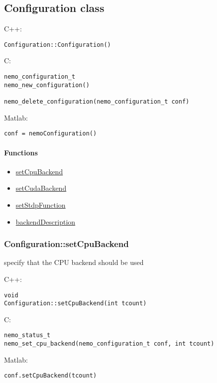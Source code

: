 \clearpage
\subsection{Configuration class}
\label{Configuration}

\noindent C++:
\begin{lstlisting}[aboveskip=2pt]
Configuration::Configuration()
\end{lstlisting}

\noindent C:
\begin{lstlisting}[aboveskip=2pt]
nemo_configuration_t
nemo_new_configuration()
 
nemo_delete_configuration(nemo_configuration_t conf)
\end{lstlisting}

\noindent Matlab:
\begin{lstlisting}[aboveskip=2pt]
conf = nemoConfiguration()
\end{lstlisting}
\paragraph{Functions}
\begin{itemize}
\item \hyperref[fn: setCpuBackend]{setCpuBackend}
\item \hyperref[fn: setCudaBackend]{setCudaBackend}
\item \hyperref[fn: setStdpFunction]{setStdpFunction}
\item \hyperref[fn: backendDescription]{backendDescription}
\end{itemize}
\clearpage
\subsubsection*{Configuration::setCpuBackend}
\label{fn: setCpuBackend}
specify that the CPU backend should be used


\noindent C++:
\begin{lstlisting}[aboveskip=2pt]
void
Configuration::setCpuBackend(int tcount)
\end{lstlisting}

\noindent C:
\begin{lstlisting}[aboveskip=2pt]
nemo_status_t
nemo_set_cpu_backend(nemo_configuration_t conf, int tcount)
\end{lstlisting}

\noindent Matlab:
\begin{lstlisting}[aboveskip=2pt]
conf.setCpuBackend(tcount)
\end{lstlisting}
